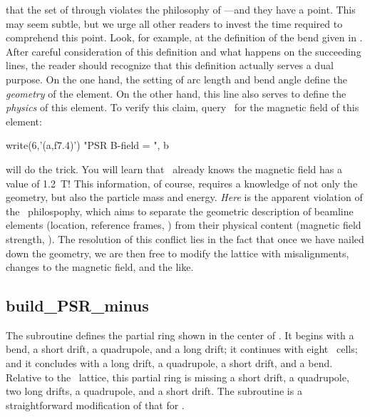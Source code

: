  that the set of
 through  violates the
philosophy of \PTC---and they have a point. This may seem subtle,
but we urge all other readers to invest the time required to
comprehend this point. Look, for example, at the definition of the
bend given in . After careful consideration of this
definition and what happens on the succeeding lines, the reader
should recognize that this definition actually serves a dual purpose.
On the one hand, the setting of arc length and bend angle define the
\emph{geometry} of the element. On the other hand, this line also
serves to define the \emph{physics} of this element. To verify this
claim, query \PTC\ for the magnetic field of this element:
\begin{ptccode}[frame=none]
  write(6,'(a,f7.4)') "PSR B-field = ", b%
\end{ptccode}
will do the trick. You will learn that \PTC\ already knows the
magnetic field has a value of \SI{1.2}{T}! This information, of
course, requires a knowledge of not only the geometry, but also the
particle mass and energy. \emph{Here} is the apparent violation of
the \PTC\ philospophy, which aims to separate the geometric
description of beamline elements (location, reference frames, \etc)
from their physical content (magnetic field strength, \etc). The
resolution of this conflict lies in the fact that once we have
nailed down the geometry, we are then free to modify the lattice
with misalignments, changes to the magnetic field, and the like.


\subsection{build\_PSR\_minus}

%
The subroutine  defines the partial ring shown
in the center of . It begins with a bend, a short
drift, a quadrupole, and a long drift; it continues with eight
\PSR\ cells; and it concludes with a long drift, a quadrupole, a short
drift, and a bend. Relative to the \PSR\ lattice, this partial ring is
missing a short drift, a quadrupole, two long drifts, a quadrupole,
and a short drift. The subroutine is a straightforward modification of
that for .
%


